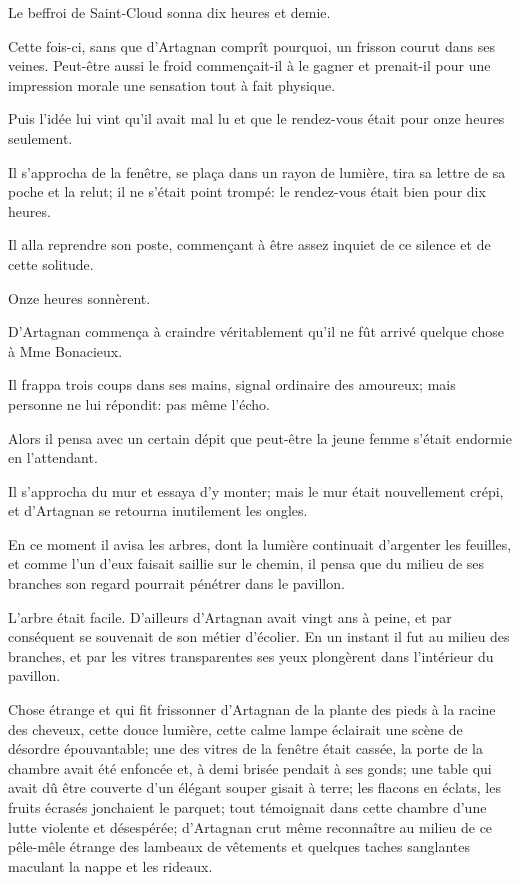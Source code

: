 Le beffroi de Saint-Cloud sonna dix heures et demie. 

Cette fois-ci, sans que d'Artagnan comprît pourquoi, un frisson courut dans ses veines. Peut-être aussi le froid commençait-il à le gagner et prenait-il pour une impression morale une sensation tout à fait physique. 

Puis l'idée lui vint qu'il avait mal lu et que le rendez-vous était pour onze heures seulement. 

Il s'approcha de la fenêtre, se plaça dans un rayon de lumière, tira sa lettre de sa poche et la relut; il ne s'était point trompé: le rendez-vous était bien pour dix heures. 

Il alla reprendre son poste, commençant à être assez inquiet de ce silence et de cette solitude. 

Onze heures sonnèrent. 

D'Artagnan commença à craindre véritablement qu'il ne fût arrivé quelque chose à Mme Bonacieux. 

Il frappa trois coups dans ses mains, signal ordinaire des amoureux; mais personne ne lui répondit: pas même l'écho. 

Alors il pensa avec un certain dépit que peut-être la jeune femme s'était endormie en l'attendant. 

Il s'approcha du mur et essaya d'y monter; mais le mur était nouvellement crépi, et d'Artagnan se retourna inutilement les ongles. 

En ce moment il avisa les arbres, dont la lumière continuait d'argenter les feuilles, et comme l'un d'eux faisait saillie sur le chemin, il pensa que du milieu de ses branches son regard pourrait pénétrer dans le pavillon. 

L'arbre était facile. D'ailleurs d'Artagnan avait vingt ans à peine, et par conséquent se souvenait de son métier d'écolier. En un instant il fut au milieu des branches, et par les vitres transparentes ses yeux plongèrent dans l'intérieur du pavillon. 

Chose étrange et qui fit frissonner d'Artagnan de la plante des pieds à la racine des cheveux, cette douce lumière, cette calme lampe éclairait une scène de désordre épouvantable; une des vitres de la fenêtre était cassée, la porte de la chambre avait été enfoncée et, à demi brisée pendait à ses gonds; une table qui avait dû être couverte d'un élégant souper gisait à terre; les flacons en éclats, les fruits écrasés jonchaient le parquet; tout témoignait dans cette chambre d'une lutte violente et désespérée; d'Artagnan crut même reconnaître au milieu de ce pêle-mêle étrange des lambeaux de vêtements et quelques taches sanglantes maculant la nappe et les rideaux. 

